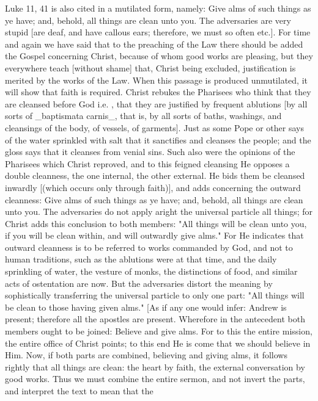 Luke 11, 41 is also cited in a mutilated form, namely: Give alms of
such things as ye have; and, behold, all things are clean unto you.
The adversaries are very stupid [are deaf, and have callous ears;
therefore, we must so often etc.].  For time and again we have said
that to the preaching of the Law there should be added the Gospel
concerning Christ, because of whom good works are pleasing, but they
everywhere teach [without shame] that, Christ being excluded,
justification is merited by the works of the Law.  When this passage
is produced unmutilated, it will show that faith is required.  Christ
rebukes the Pharisees who think that they are cleansed before God i.e.
, that they are justified by frequent ablutions [by all sorts of
_baptismata carnis_, that is, by all sorts of baths, washings, and
cleansings of the body, of vessels, of garments].  Just as some Pope
or other says of the water sprinkled with salt that it sanctifies and
cleanses the people; and the gloss says that it cleanses from venial
sins.  Such also were the opinions of the Pharisees which Christ
reproved, and to this feigned cleansing He opposes a double cleanness,
the one internal, the other external.  He bids them be cleansed
inwardly [(which occurs only through faith)], and adds concerning the
outward cleanness: Give alms of such things as ye have; and, behold,
all things are clean unto you.  The adversaries do not apply aright
the universal particle all things; for Christ adds this conclusion to
both members: "All things will be clean unto you, if you will be
clean within, and will outwardly give alms." For He indicates that
outward cleanness is to be referred to works commanded by God, and
not to human traditions, such as the ablutions were at that time, and
the daily sprinkling of water, the vesture of monks, the distinctions
of food, and similar acts of ostentation are now.  But the
adversaries distort the meaning by sophistically transferring the
universal particle to only one part: "All things will be clean to
those having given alms." [As if any one would infer: Andrew is
present; therefore all the apostles are present.  Wherefore in the
antecedent both members ought to be joined: Believe and give alms.
For to this the entire mission, the entire office of Christ points;
to this end He is come that we should believe in Him.  Now, if both
parts are combined, believing and giving alms, it follows rightly
that all things are clean: the heart by faith, the external
conversation by good works.  Thus we must combine the entire sermon,
and not invert the parts, and interpret the text to mean that the
